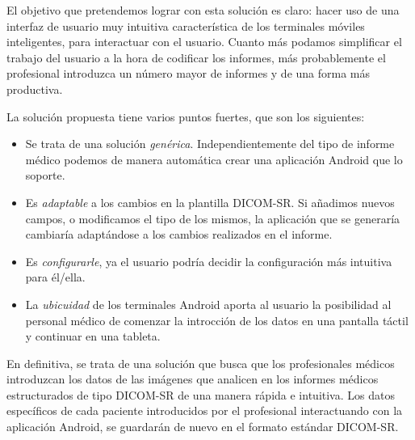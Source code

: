 El objetivo que pretendemos lograr con esta solución es claro: hacer uso de una interfaz de usuario muy intuitiva característica de los terminales móviles inteligentes, para interactuar con el usuario. Cuanto más podamos simplificar el trabajo del usuario a la hora de codificar los informes, más probablemente el profesional introduzca un número mayor de informes y de una forma más productiva. \medskip\par
La solución propuesta tiene varios puntos fuertes, que son los siguientes:
\begin{itemize}
\item Se trata de una solución \textit{genérica}. Independientemente del tipo de informe médico podemos de manera automática crear una aplicación Android que lo soporte.
\item Es \textit{adaptable} a los cambios en la plantilla DICOM-SR. Si añadimos nuevos campos, o modificamos el tipo de los mismos, la aplicación que se generaría cambiaría adaptándose a los cambios realizados en el informe.
\item Es \textit{configurarle}, ya el usuario podría decidir la configuración más intuitiva para él/ella.
\item La \textit{ubicuidad} de los terminales Android aporta al usuario la posibilidad al personal médico de comenzar la introcción de los datos en una pantalla táctil y continuar en una tableta. 
\end{itemize}
\medskip\par

En definitiva, se trata de una solución que busca que los profesionales médicos introduzcan los datos de las imágenes que analicen en los informes médicos estructurados de tipo DICOM-SR  de una manera rápida e intuitiva. Los datos específicos de cada paciente introducidos por el profesional interactuando con la aplicación Android, se guardarán de nuevo en el formato estándar DICOM-SR. 